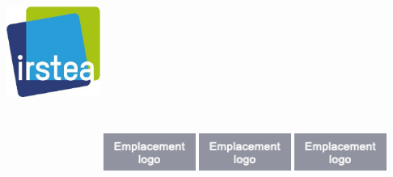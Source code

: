 \begin{minipage}{\linewidth}
\vspace{1.3cm}
\hspace{-1.4cm}
\includegraphics[width=3.06cm,height=9.57cm,keepaspectratio]{Image/logo_irstea}%
\vspace{-1cm}
\hspace{2cm}
\includegraphics[width=3cm,height=3cm,keepaspectratio]
{Image/emplacement_logo}%
\vspace{-1cm}
\hspace{1cm}
\includegraphics[width=3cm,height=3cm,keepaspectratio]
{Image/emplacement_logo}%
\vspace{-1cm}
\hspace{1cm}
\includegraphics[width=3cm,height=3cm,keepaspectratio]
{Image/emplacement_logo}%
\end{minipage}
